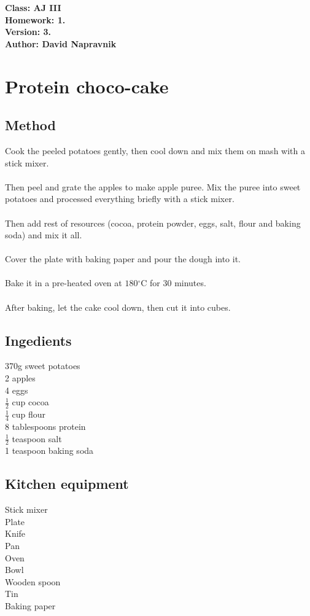 \documentclass[a4paper]{article}
\begin{document}
\noindent
\textbf{Class: AJ III}\\
\textbf{Homework: 1.}\\
\textbf{Version: 3.}\\
\textbf{Author: David Napravnik}

\section*{Protein choco-cake}

\subsection*{Method}
Cook the peeled potatoes gently, then cool down and mix
them on mash with a stick mixer.
\\\\
Then peel and grate the apples to make apple puree. Mix the
puree into sweet potatoes and processed everything briefly with a stick mixer.
\\\\
Then add rest of resources (cocoa, protein powder, eggs, salt, flour and baking soda)
and mix it all.
\\\\
Cover the plate with baking paper and pour the dough into it.
\\\\
Bake it in a pre-heated oven at $180{}^\circ$C for 30 minutes.
\\\\
After baking, let the cake cool down, then cut it into cubes.


\begin{multicols}{2}
	\subsection*{Ingedients}
	370g sweet potatoes\\
	2 apples\\
	4 eggs\\
	$\frac{1}{2}$ cup cocoa\\
	$\frac{1}{4}$ cup flour\\
	8 tablespoons protein\\
	$\frac{1}{2}$ teaspoon salt\\
	1 teaspoon baking soda
	
	

	\subsection*{Kitchen equipment}
	Stick mixer\\
	Plate\\
	Knife\\
	Pan\\
	Oven\\
	Bowl\\
	Wooden spoon\\
	Tin\\
	Baking paper

	
		
\end{multicols}
\end{document}
